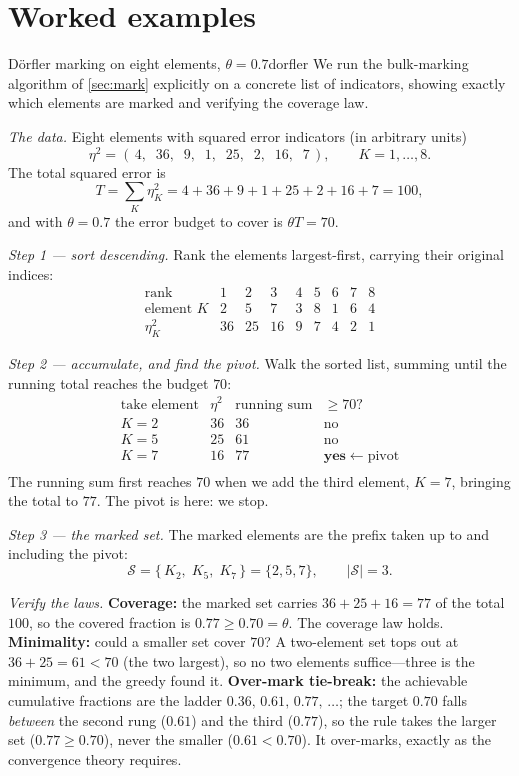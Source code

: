 \section{Worked examples}
\label{sec:worked}

\begin{workedexample}{D\"orfler marking on eight elements, $\theta = 0.7$}{dorfler}
\label{wex:dorfler}
We run the bulk-marking algorithm of \cref{sec:mark} explicitly on a concrete list of
indicators, showing exactly which elements are marked and verifying the coverage law.

\emph{The data.} Eight elements with squared error indicators (in arbitrary units)
\[
\eta^2 = (\,4,\;\;36,\;\;9,\;\;1,\;\;25,\;\;2,\;\;16,\;\;7\,),
\qquad K = 1,\dots,8.
\]
The total squared error is
\[
T = \sum_K \eta_K^2 = 4+36+9+1+25+2+16+7 = 100,
\]
and with $\theta = 0.7$ the error budget to cover is $\theta T = 70$.

\emph{Step 1 --- sort descending.} Rank the elements largest-first, carrying their
original indices:
\[
\begin{array}{c|cccccccc}
\text{rank} & 1 & 2 & 3 & 4 & 5 & 6 & 7 & 8 \\\hline
\text{element } K & 2 & 5 & 7 & 3 & 8 & 1 & 6 & 4 \\
\eta_K^2 & 36 & 25 & 16 & 9 & 7 & 4 & 2 & 1
\end{array}
\]

\emph{Step 2 --- accumulate, and find the pivot.} Walk the sorted list, summing until
the running total reaches the budget $70$:
\[
\begin{array}{c|c|c|c}
\text{take element} & \eta^2 & \text{running sum} & \ge 70? \\\hline
K=2 & 36 & 36 & \text{no} \\
K=5 & 25 & 61 & \text{no} \\
K=7 & 16 & 77 & \textbf{yes} \;\leftarrow\; \text{pivot} \\
\end{array}
\]
The running sum first reaches $70$ when we add the third element, $K = 7$, bringing
the total to $77$. The pivot is here: we stop.

\emph{Step 3 --- the marked set.} The marked elements are the prefix taken up to and
including the pivot:
\[
\mathcal S = \{\,K_2,\;K_5,\;K_7\,\} = \{2, 5, 7\},
\qquad |\mathcal S| = 3.
\]

\emph{Verify the laws.} \textbf{Coverage:} the marked set carries
$36 + 25 + 16 = 77$ of the total $100$, so the covered fraction is $0.77 \ge 0.70 =
\theta$. The coverage law holds. \textbf{Minimality:} could a smaller set cover
$70$? A two-element set tops out at $36 + 25 = 61 < 70$ (the two largest), so no two
elements suffice---three is the minimum, and the greedy found it. \textbf{Over-mark
tie-break:} the achievable cumulative fractions are the ladder
$0.36,\,0.61,\,0.77,\,\dots$; the target $0.70$ falls \emph{between} the second rung
($0.61$) and the third ($0.77$), so the rule takes the larger set ($0.77 \ge 0.70$),
never the smaller ($0.61 < 0.70$). It over-marks, exactly as the convergence theory
requires.


\end{workedexample}
